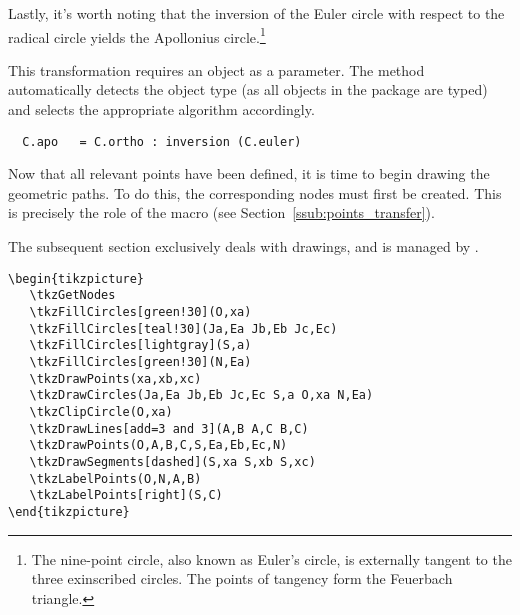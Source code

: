 \vspace{1em}

Lastly, it's worth noting that the inversion of the Euler circle with respect to the radical circle yields the Apollonius circle.\footnote{The nine-point circle, also known as Euler's circle, is externally tangent to the three exinscribed circles. The points of tangency form the Feuerbach triangle.}

This transformation requires an object as a parameter. The method automatically detects the object type (as all objects in the package are typed) and selects the appropriate algorithm accordingly.

\begin{mybox}{}
\begin{verbatim}
  C.apo   = C.ortho : inversion (C.euler)
\end{verbatim}
\end{mybox}

Now that all relevant points have been defined, it is time to begin drawing the geometric paths. To do this, the corresponding nodes must first be created. This is precisely the role of the macro  (see Section~\ref{ssub:points_transfer}).

The subsequent section exclusively deals with drawings, and is managed by .

\begin{verbatim}
\begin{tikzpicture}
   \tkzGetNodes
   \tkzFillCircles[green!30](O,xa)
   \tkzFillCircles[teal!30](Ja,Ea Jb,Eb Jc,Ec)
   \tkzFillCircles[lightgray](S,a)
   \tkzFillCircles[green!30](N,Ea)
   \tkzDrawPoints(xa,xb,xc)
   \tkzDrawCircles(Ja,Ea Jb,Eb Jc,Ec S,a O,xa N,Ea)
   \tkzClipCircle(O,xa)
   \tkzDrawLines[add=3 and 3](A,B A,C B,C)
   \tkzDrawPoints(O,A,B,C,S,Ea,Eb,Ec,N)
   \tkzDrawSegments[dashed](S,xa S,xb S,xc)
   \tkzLabelPoints(O,N,A,B)
   \tkzLabelPoints[right](S,C)
\end{tikzpicture}
\end{verbatim}

